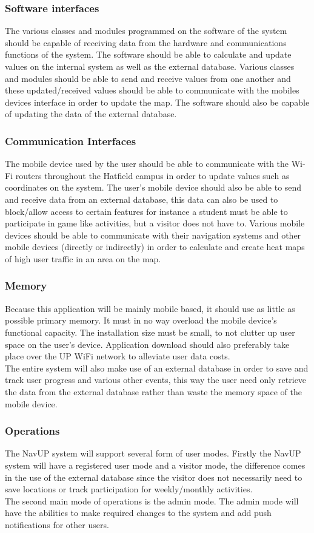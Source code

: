 \documentclass[a4paper,12pt]{article}
\begin{document}
\subsubsection{Software interfaces}
The various classes and modules programmed on the software of the system should be capable of receiving data from the hardware and communications functions of the system. The software should be able to calculate and update values on the internal system as well as the external database. Various classes and modules should be able to send and receive values from one another and these updated/received values should be able to communicate with the mobiles devices interface in order to update the map. The software should also be capable of updating the data of the external database.\\
\subsubsection{Communication Interfaces}
The mobile device used by the user should be able to communicate with the Wi-Fi routers throughout the Hatfield campus in order to update values such as coordinates on the system. The user’s mobile device should also be able to send and receive data from an external database, this data can also be used to block/allow access to certain features for instance a student must be able to participate in game like activities, but a visitor does not have to. Various mobile devices should be able to communicate with their navigation systems and other mobile devices (directly or indirectly) in order to calculate and create heat maps of high user traffic in an area on the map.
\subsubsection{Memory}
Because this application will be mainly mobile based, it should use as little as possible primary memory. It must in no way overload the mobile device's functional capacity. The installation size must be small, to not clutter up user space on the user's device. Application download should also preferably take place over the UP WiFi network to alleviate user data costs.\\
The entire system will also make use of an external database in order to save and track user progress and various other events, this way the user need only retrieve the data from the external database rather than waste the memory space of the mobile device.
\subsubsection{Operations}
The NavUP system will support several form of user modes. Firstly the NavUP system will have a registered user mode and a visitor mode, the difference comes in the use of the external database since the visitor does not necessarily need to save locations or track participation for weekly/monthly activities.\\
The second main mode of operations is the admin mode. The admin mode will have the abilities to make required changes to the system and add push notifications for other users. 
\end{document}
